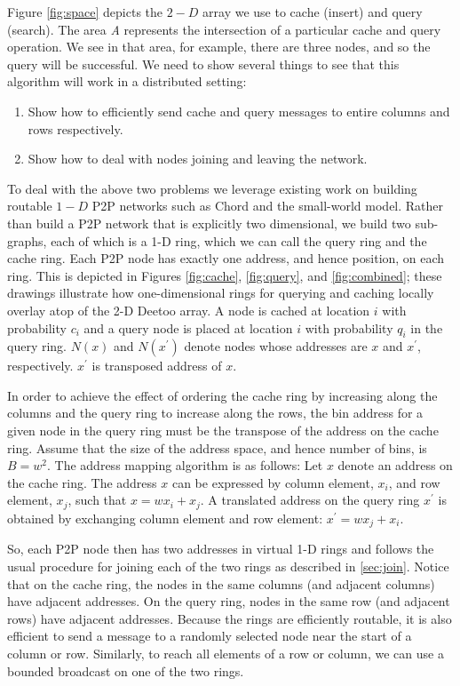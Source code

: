 \documentclass[conference]{IEEEtran}
\begin{document}
Figure \ref{fig:space} depicts the $2-D$ array we use to cache (insert)
and query (search).  The area \textit{A} represents the
intersection of a particular cache and query operation.  We see in that
area, for example, there are three nodes, and so the query will be successful.  We need to
show several things to see that this algorithm will work in a distributed
setting:
\begin{enumerate}
\item Show how to efficiently send cache and query messages to entire columns
and rows respectively.
\item Show how to deal with nodes joining and leaving the network.
\end{enumerate}

To deal with the above two problems we leverage existing work on building
routable $1-D$ P2P networks such as Chord\cite{is:Chord} and the small-world
model\cite{jk:Algorithmic}.  Rather than build a P2P network that is
explicitly two dimensional, we build two sub-graphs, each of which is a 1-D 
ring, which we can call the query ring and the cache ring.  Each P2P 
node has exactly one address, and hence position, on each ring.  This is
depicted in Figures \ref{fig:cache}, \ref{fig:query}, and \ref{fig:combined}; 
these drawings illustrate how one-dimensional rings for querying and caching 
locally overlay atop of the 2-D Deetoo array.
A node is cached at location $i$ with probability $c_{i}$ and a
query node is placed at location $i$ with probability $q_{i}$ in the query ring. 
$N(x)$ and $N(x^\prime)$ denote nodes whose addresses are $x$ and $x^\prime$, respectively.
$x^\prime$ is transposed address of $x$.

In order to achieve the effect of ordering the cache ring by increasing
along the columns and the query ring to increase along the rows, the bin
address for a given node in the query ring must be the transpose of the
address on the cache ring.  
Assume that the size of the address space,
and hence number of bins, is $B=w^2$.
The address mapping algorithm is as
follows: Let $x$ denote an address on the cache ring. The address
$x$ can be expressed by
column element, $x_{i}$, and row element, $x_{j}$, such
that $x = w x_i + x_j$.
A translated address on the query ring $x^\prime$ is obtained by exchanging
column element and row element:
$x^\prime = w x_{j} +x_{i}$.

So, each P2P node then has two addresses in virtual 1-D rings and follows the usual
procedure for joining each of the two rings as described in \ref{sec:join}.
Notice that on the cache ring, the nodes in the same columns (and adjacent
columns) have adjacent addresses.  On the query ring, nodes in the same row
(and adjacent rows) have adjacent addresses.  Because the rings are efficiently
routable, it is also efficient to send a message to a randomly selected node near
the start of a column or row.  Similarly, to reach all elements of a row or
column, we can use a bounded broadcast on one of the two rings.  
\end{document}

